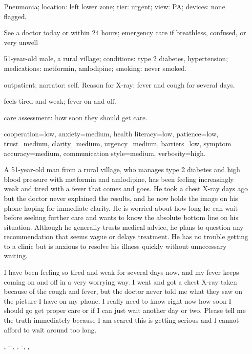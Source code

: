 \begin{scenariobox}
\begin{description}[leftmargin=0pt,itemsep=1pt,font=\normalfont\bfseries]\item[Ground truth] Pneumonia; location: left lower zone; tier: urgent; view: PA; devices: none flagged.\item[Expected guidance] See a doctor today or within 24 hours; emergency care if breathless, confused, or very unwell\item[Profile] 51-year-old male, a rural village; conditions: type 2 diabetes, hypertension; medications: metformin, amlodipine; smoking: never smoked.\item[Framing] outpatient; narrator: self. Reason for X-ray: fever and cough for several days.\item[Symptoms] feels tired and weak; fever on and off.\item[Intent] care assessment: how soon they should get care.\item[Personality] cooperation=low, anxiety=medium, health literacy=low, patience=low, trust=medium, clarity=medium, urgency=medium, barriers=low, symptom accuracy=medium, communication style=medium, verbosity=high.\item[Scenario] A 51-year-old man from a rural village, who manages type 2 diabetes and high blood pressure with metformin and amlodipine, has been feeling increasingly weak and tired with a fever that comes and goes. He took a chest X-ray days ago but the doctor never explained the results, and he now holds the image on his phone hoping for immediate clarity. He is worried about how long he can wait before seeking further care and wants to know the absolute bottom line on his situation. Although he generally trusts medical advice, he plans to question any recommendation that seems vague or delays treatment. He has no trouble getting to a clinic but is anxious to resolve his illness quickly without unnecessary waiting.\item[Opening (EN)] I have been feeling so tired and weak for several days now, and my fever keeps coming on and off in a very worrying way. I went and got a chest X-ray taken because of the cough and fever, but the doctor never told me what they saw on the picture I have on my phone. I really need to know right now how soon I should go get proper care or if I can just wait another day or two. Please tell me the truth immediately because I am scared this is getting serious and I cannot afford to wait around too long.\item[Opening (BN)] , --, , -, , \end{description}
\end{scenariobox}


